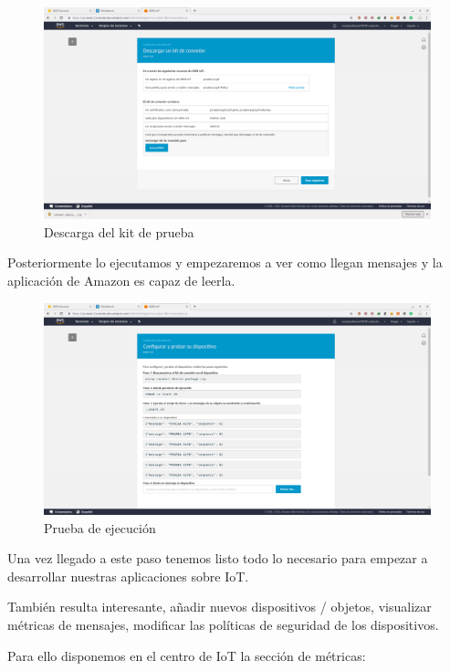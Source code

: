 \begin{figure}[h]
	\centering
	\includegraphics[scale=0.2]{iot_aws/creacion4.png}
	\caption{Descarga del kit de prueba}
	\label{AWSIOT4}
\end{figure}

\newpage
Posteriormente lo ejecutamos y empezaremos a ver como llegan mensajes y la aplicación de Amazon es capaz de leerla.

\begin{figure}[h]
	\centering
	\includegraphics[scale=0.2]{iot_aws/creacion5.png}
	\caption{Prueba de ejecución}
	\label{AWSIOT5}
\end{figure}

Una vez llegado a este paso tenemos listo todo lo necesario para empezar a desarrollar nuestras aplicaciones sobre IoT.

También resulta interesante, añadir nuevos dispositivos / objetos, visualizar métricas de mensajes, modificar las políticas de seguridad de los dispositivos.

Para ello disponemos en el centro de IoT la sección de métricas:

